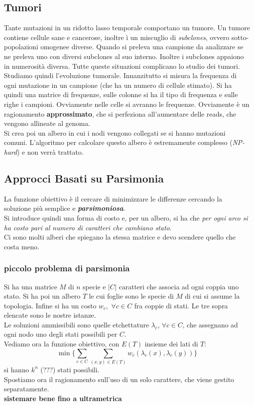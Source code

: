 \documentclass[a4paper,12pt, oneside]{book}
\begin{document}
\subsection{Tumori}
Tante mutazioni in un ridotto lasso temporale comportano un tumore.
Un tumore contiene cellule sane e cancerose, inoltre ì un miscuglio di
\textit{subclones}, ovvero sotto-popolazioni omogenee diverse. Quando
si preleva una campione da analizzare se ne preleva uno con diversi
subclones al suo interno. Inoltre i subclones appaiono in numerosità
diversa. Tutte queste situazioni complicano lo studio dei tumori.\\
Studiamo quindi l'evoluzione tumorale. Innanzitutto si misura la
frequenza di ogni mutazione in un campione (che ha un numero di
cellule stimato). Si ha quindi una matrice di frequenze, sulle colonne
si ha il tipo di frequenza e sulle righe i campioni. Ovviamente nelle
celle si avranno le frequenze. Ovviamente è un ragionamento
\textbf{approssimato}, che si perfeziona all'aumentare delle reads,
che vengono allineate al genoma.\\
Si crea poi un albero in cui i nodi vengono collegati se si hanno
mutazioni comuni. L'algoritmo per calcolare questo albero è
estremamente complesso (\textit{NP-hard}) e non verrà trattato. 
\subsection{Approcci Basati su Parsimonia}
La funzione obiettivo è il cercare di minimizzare le differenze
cercando la soluzione più semplice e \textbf{\textit{parsimoniosa}}.\\
Si introduce quindi una forma di costo e, per un albero, si ha che
\textit{per ogni arco si ha costo pari al numero di caratteri che
  cambiano stato}.\\
Ci sono molti alberi che spiegano la stessa matrice e devo scendere
quello che costa meno.
\subsubsection{piccolo problema di parsimonia}
Si ha una matrice $M$ di $n$ specie e $|C|$ caratteri che
associa ad ogni coppia uno stato. Si ha poi un albero $T$ le cui
foglie sono le specie di $M$ di cui si assume la topologia. Infine si
ha un costo $w_c,\,\,\forall c\in C$ fra coppie 
di stati. Le tre sopra elencate sono le nostre istanze. \\
Le soluzioni ammissibili sono quelle etchettature $\lambda_c$,
$\forall c\in C$, che assegnano ad ogni nodo uno degli stati
possibili per $C$.\\
Vediamo ora la funzione obiettivo, con $E(T)$ insieme dei lati di $T$:
\[\min\{\sum_{c\in C}\sum_{(x,y)\in
    E(T)}w_c(\lambda_c(x),\lambda_c(y))\}\]
si hanno $k^n$ (???) stati possibili.\\
Spostiamo ora il ragionamento sull'uso di un solo carattere, che viene
gestito separatamente.\\
\textbf{sistemare bene fino a ultrametrica}
\end{document}
